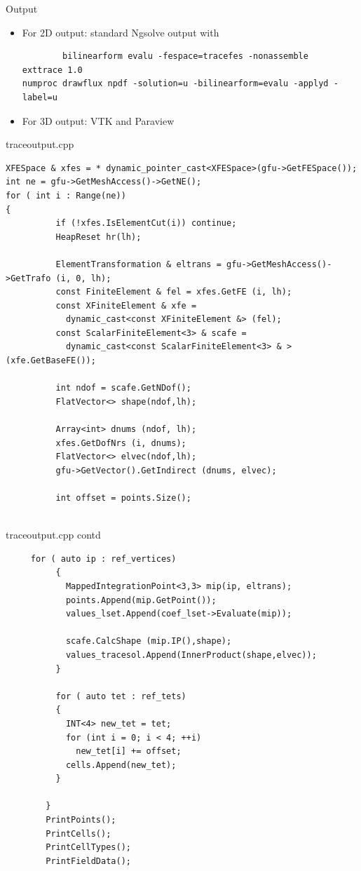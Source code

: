 \documentclass[11pt]{beamer}
\theoremstyle{plain}
\theoremstyle{definition}
\theoremstyle{remark}
\begin{document}
\begin{frame}[fragile]{Output}
	\begin{itemize}
		\item{For 2D output: standard Ngsolve output with
		\pause
		\begin{lstlisting}
		bilinearform evalu -fespace=tracefes -nonassemble
exttrace 1.0
numproc drawflux npdf -solution=u -bilinearform=evalu -applyd -label=u
		\end{lstlisting}
		}
		\pause
		\item{For 3D output: VTK and Paraview}
		
	\end{itemize}
\end{frame}

\begin{frame}[fragile]{traceoutput.cpp}
	\begin{lstlisting}
XFESpace & xfes = * dynamic_pointer_cast<XFESpace>(gfu->GetFESpace());
int ne = gfu->GetMeshAccess()->GetNE();
for ( int i : Range(ne))
{
          if (!xfes.IsElementCut(i)) continue;
          HeapReset hr(lh);

          ElementTransformation & eltrans = gfu->GetMeshAccess()->GetTrafo (i, 0, lh);
          const FiniteElement & fel = xfes.GetFE (i, lh);
          const XFiniteElement & xfe =
            dynamic_cast<const XFiniteElement &> (fel);
          const ScalarFiniteElement<3> & scafe =
            dynamic_cast<const ScalarFiniteElement<3> & > (xfe.GetBaseFE());

          int ndof = scafe.GetNDof();
          FlatVector<> shape(ndof,lh);

          Array<int> dnums (ndof, lh);
          xfes.GetDofNrs (i, dnums);
          FlatVector<> elvec(ndof,lh);
          gfu->GetVector().GetIndirect (dnums, elvec);

          int offset = points.Size();
          
	\end{lstlisting}
\end{frame}
\begin{frame}[fragile]{traceoutput.cpp contd}
	\begin{lstlisting}
     for ( auto ip : ref_vertices)
          {
            MappedIntegrationPoint<3,3> mip(ip, eltrans);
            points.Append(mip.GetPoint());
            values_lset.Append(coef_lset->Evaluate(mip));

            scafe.CalcShape (mip.IP(),shape);
            values_tracesol.Append(InnerProduct(shape,elvec));
          }

          for ( auto tet : ref_tets)
          {
            INT<4> new_tet = tet;
            for (int i = 0; i < 4; ++i)
              new_tet[i] += offset;
            cells.Append(new_tet);
          }

        }
        PrintPoints();
        PrintCells();
        PrintCellTypes();
        PrintFieldData();
        \end{lstlisting}
\end{frame}
\end{document}
